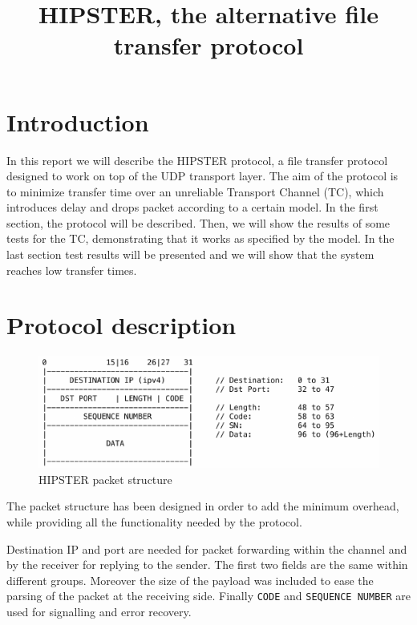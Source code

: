 \documentclass[10pt,twocolumn]{article}
\begin{document}
\title{HIPSTER, the alternative file transfer protocol}
\author{}
\date{}
\maketitle

\section{Introduction}
In this report we will describe the HIPSTER protocol, a file transfer protocol designed to work on top of the UDP transport layer. The aim of the protocol is to minimize transfer time over an unreliable Transport Channel (TC), which introduces delay and drops packet according to a certain model. In the first section, the protocol will be described. Then, we will show the results of some tests for the TC, demonstrating that it works as specified by the model. In the last section test results will be presented and we will show that the system reaches low transfer times.

\section{Protocol description}
\begin{figure}[htp]
	\centering
	\includegraphics[width=0.95\columnwidth]{tex/images/packet_structure.pdf}
	\caption{HIPSTER packet structure}
	\label{fig:header}
\end{figure}

The packet structure has been designed in order to add the minimum overhead,
while providing all the functionality needed by the protocol.

Destination IP and port are needed for packet forwarding within the channel
and by the receiver for replying to the sender. The first two fields are the
same within different groups. Moreover the size of the payload was included to
ease the parsing of the packet at the receiving side. Finally \texttt{CODE} and
\texttt{SEQUENCE NUMBER} are used for signalling and error recovery.
\end{document}
